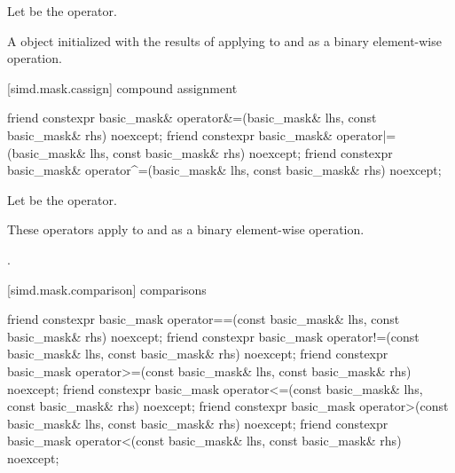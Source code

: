 \begin{itemdescr}
\pnum
Let  be the operator.

\pnum
\returns
A  object initialized with the results of applying
 to  and  as a binary element-wise
operation.
\end{itemdescr}

[simd.mask.cassign]{ compound assignment}

\begin{itemdecl}
friend constexpr basic_mask&
  operator&=(basic_mask& lhs, const basic_mask& rhs) noexcept;
friend constexpr basic_mask&
  operator|=(basic_mask& lhs, const basic_mask& rhs) noexcept;
friend constexpr basic_mask&
  operator^=(basic_mask& lhs, const basic_mask& rhs) noexcept;
\end{itemdecl}

\begin{itemdescr}
\pnum
Let  be the operator.

\pnum
\effects
These operators apply  to  and  as a
binary element-wise operation.

\pnum
\returns
{}.
\end{itemdescr}

[simd.mask.comparison]{ comparisons}

\begin{itemdecl}
friend constexpr basic_mask
  operator==(const basic_mask& lhs, const basic_mask& rhs) noexcept;
friend constexpr basic_mask
  operator!=(const basic_mask& lhs, const basic_mask& rhs) noexcept;
friend constexpr basic_mask
  operator>=(const basic_mask& lhs, const basic_mask& rhs) noexcept;
friend constexpr basic_mask
  operator<=(const basic_mask& lhs, const basic_mask& rhs) noexcept;
friend constexpr basic_mask
  operator>(const basic_mask& lhs, const basic_mask& rhs) noexcept;
friend constexpr basic_mask
  operator<(const basic_mask& lhs, const basic_mask& rhs) noexcept;
\end{itemdecl}

